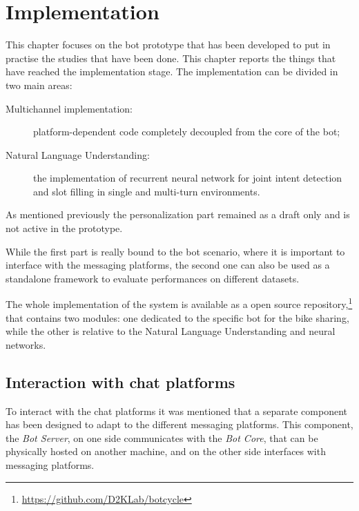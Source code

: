 
\chapter{Implementation}
\label{implementation}

This chapter focuses on the bot prototype that has been developed to put in practise the studies that have been done. This chapter reports the things that have reached the implementation stage. The implementation can be divided in two main areas:

\begin{description}
	\item[Multichannel implementation:] platform-dependent code completely decoupled from the core of the bot;
	\item[Natural Language Understanding:] the implementation of recurrent neural network for joint intent detection and slot filling in single and multi-turn environments.
\end{description}
As mentioned previously the personalization part remained as a draft only and is not active in the prototype.

While the first part is really bound to the bot scenario, where it is important to interface with the messaging platforms, the second one can also be used as a standalone framework to evaluate performances on different datasets.

The whole implementation of the system is available as a open source repository,\footnote{\url{https://github.com/D2KLab/botcycle}} that contains two modules: one dedicated to the specific bot for the bike sharing, while the other is relative to the Natural Language Understanding and neural networks.

\section{Interaction with chat platforms}
\label{implementationInteraction}

To interact with the chat platforms it was mentioned that a separate component has been designed to adapt to the different messaging platforms. This component, the \textit{Bot Server}, on one side communicates with the \textit{Bot Core}, that can be physically hosted on another machine, and on the other side interfaces with messaging platforms.

